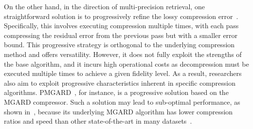 On the other hand, in the direction of multi-precision retrieval, one straightforward solution is to progressively refine the lossy compression error~\cite{peter-tvcg24-pframework}. 
Specifically, this involves executing compression multiple times, with each pass compressing the residual error from the previous pass but with a smaller error bound. 
This progressive strategy is orthogonal to the underlying compression method and offers versatility. However, it does not fully exploit the strengths of the base algorithm, and it incurs high operational costs as decompression must be executed multiple times to achieve a given fidelity level. As a result, researchers also aim to exploit progressive characteristics inherent in specific compression algorithms. PMGARD~\cite{pmgard, pmgard-qoi}, for instance, is a progressive solution based on the MGARD compressor. Such a solution may lead to sub-optimal performance, as shown in~, because its underlying MGARD algorithm has lower compression ratios and speed than other state-of-the-art in many datasets~\cite{interp, qoz, qoz2}.


